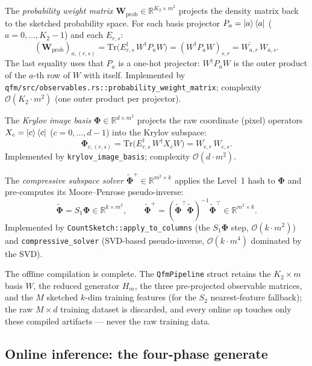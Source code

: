 \documentclass[11pt, a4paper]{article}
\newcommand{\Rset}{\mathbb{R}}
\begin{document}
The \emph{probability weight matrix} $\mathbf{W}_{\mathrm{prob}}\in\Rset^{K_2\times m^2}$
projects the density matrix back to the sketched probability space. For each
basis projector $P_a=\ket{a}\bra{a}$ ($a=0,\dots,K_2-1$) and each
$E_{r,s}$:
\begin{equation}
  (\mathbf{W}_{\mathrm{prob}})_{a,(r,s)}
  =\mathrm{Tr}\bigl(E_{r,s}^\dagger\,W^\dagger P_a W\bigr)
  =(W^\dagger P_a W)_{s,r}
  =\overline{W_{a,r}}\,W_{a,s}.
\end{equation}
The last equality uses that $P_a$ is a one-hot projector: $W^\dagger P_a W$ is
the outer product of the $a$-th row of $W$ with itself. Implemented by
\texttt{qfm/src/observables.rs::probability\_weight\_matrix}; complexity
$\mathcal{O}(K_2\cdot m^2)$ (one outer product per projector).

The \emph{Krylov image basis} $\mathbf\Phi\in\Rset^{d\times m^2}$ projects
the raw coordinate (pixel) operators $X_c=\ket{c}\bra{c}$ ($c=0,\dots,d-1$)
into the Krylov subspace:
\begin{equation}
  \mathbf\Phi_{c,(r,s)}=\mathrm{Tr}\bigl(E_{r,s}^\dagger\,W^\dagger X_c W\bigr)
  =\overline{W_{c,r}}\,W_{c,s}.
\end{equation}
Implemented by \texttt{krylov\_image\_basis}; complexity $\mathcal{O}(d\cdot m^2)$.

The \emph{compressive subspace solver} $\tilde{\mathbf\Phi}^+\in\Rset^{m^2\times k}$
applies the Level~1 hash to $\mathbf\Phi$ and pre-computes its
Moore--Penrose pseudo-inverse:
\begin{equation}
  \tilde{\mathbf\Phi}=S_1\mathbf\Phi\in\Rset^{k\times m^2},\qquad
  \tilde{\mathbf\Phi}^+=(\tilde{\mathbf\Phi}^\top\tilde{\mathbf\Phi})^{-1}
  \tilde{\mathbf\Phi}^\top\in\Rset^{m^2\times k}.
\end{equation}
Implemented by \texttt{CountSketch::apply\_to\_columns} (the $S_1\mathbf\Phi$
step, $\mathcal{O}(k\cdot m^2)$) and \texttt{compressive\_solver} (SVD-based
pseudo-inverse, $\mathcal{O}(k\cdot m^4)$ dominated by the SVD).

The offline compilation is complete. The \texttt{QfmPipeline} struct retains
the $K_2\times m$ basis $W$, the reduced generator $H_m$, the three
pre-projected observable matrices, and the $M$ sketched $k$-dim training
features (for the $S_2$ nearest-feature fallback); the raw $M\times d$
training dataset is discarded, and every online op touches only these
compiled artifacts --- never the raw training data.

\subsection{Online inference: the four-phase generate}
\end{document}
